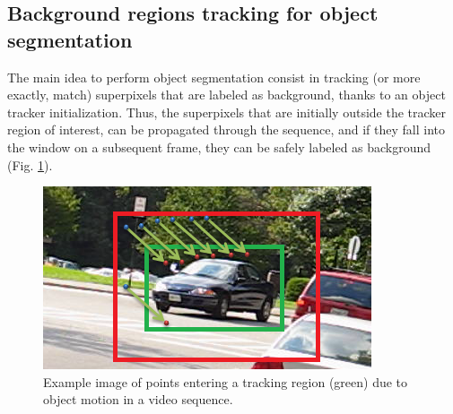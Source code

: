 \subsection{Background regions tracking for object segmentation}
\label{sec:segm}
 
The main idea to perform object segmentation consist in tracking (or more exactly, match) superpixels that are labeled as background, thanks to an object tracker initialization. Thus, the superpixels that are initially outside the tracker region of interest, 
can be propagated through the sequence, and if they fall into the window on a subsequent frame, they
can be safely labeled as background (Fig.  \ref{figurelabel_entering}). \\

   \begin{figure}[thpb]
      \centering
      \includegraphics[height=0.25\textheight]{../images/tracking_points.png}
      \caption{Example image of points entering a tracking region (green) due to object motion in a video sequence.}
      \label{figurelabel_entering}
   \end{figure}
\setlength{\belowcaptionskip}{-10pt}


